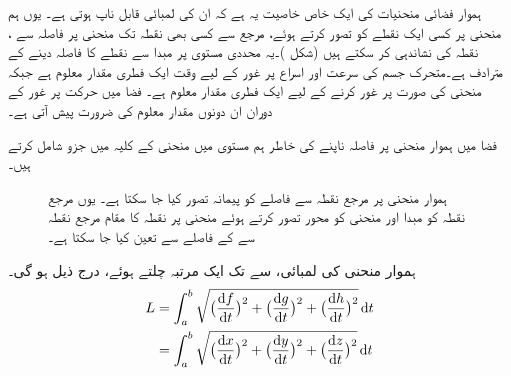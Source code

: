 ہموار فضائی منحنیات کی ایک خاص خاصیت یہ ہے کہ ان کی لمبائی  قابل ناپ ہوتی ہے۔ یوں ہم  منحنی پر کسی ایک نقطے کو  تصور کرتے ہوئے،  مرجع   سے کسی بھی نقطہ   تک منحنی پر فاصلہ  سے ، نقطہ      کی نشاندہی کر سکتے ہیں (شکل )۔یہ محددی مستوی پر  مبدا سے نقطے کا فاصلہ دینے کے مترادف ہے۔متحرک جسم کی سرعت اور اسراع  پر غور کے لیے وقت ایک فطری مقدار معلوم  ہے جبکہ  منحنی کی صورت  پر غور کرنے کے لیے ایک  فطری  مقدار معلوم  ہے۔ فضا میں حرکت پر غور کے دوران ان دونوں مقدار معلوم  کی ضرورت پیش آتی ہے۔

فضا میں ہموار منحنی پر فاصلہ ناپنے کی خاطر  ہم مستوی میں منحنی کے کلیہ میں جزو  شامل کرتے ہیں۔

\begin{figure}
\centering
{}
\caption
{ہموار منحنی  پر  مرجع نقطہ سے فاصلے   کو   پیمانہ  تصور کیا  جا سکتا ہے۔ یوں  مرجع نقطہ کو مبدا اور منحنی کو محور تصور کرتے ہوئے منحنی پر نقطہ  کا مقام  مرجع  نقطہ سے   کے فاصلے سے تعین کیا جا سکتا ہے۔}
\label{شکل_سمتی_تفاعل_ہموار_منحنی_بنیاد}
\end{figure}
ہموار منحنی   کی لمبائی،    سے  تک  ایک مرتبہ چلتے ہوئے،   درج ذیل ہو گی۔
\begin{gather}
\begin{aligned}\label{مساوات_سمتی_تفاعل_لمبائی_قوس_الف}
L&=\int_a^b\sqrt{\big(\frac{\dif f}{\dif t}\big)^2+\big(\frac{\dif g}{\dif t}\big)^2+\big(\frac{\dif h}{\dif t}\big)^2}\dif t\\
&=\int_a^b\sqrt{\big(\frac{\dif x}{\dif t}\big)^2+\big(\frac{\dif y}{\dif t}\big)^2+\big(\frac{\dif z}{\dif t}\big)^2}\dif t
\end{aligned}
\end{gather} 

